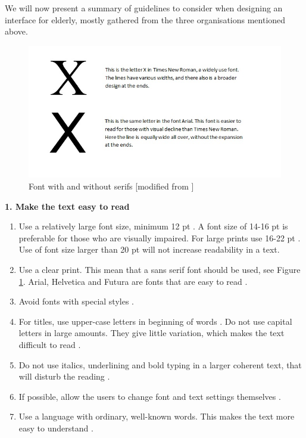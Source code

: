 We will now present a summary of guidelines to consider when designing an interface for elderly, mostly gathered from the three organisations mentioned above.

\begin{figure} [ht!]
\centering
\includegraphics[scale=0.9]{fontExample.jpg}
\caption[Fonts]{Font with and without serifs [modified from \cite{blindeforbundetTekst}]}
\label{fig:fonts}
\end{figure}

\textbf{1. Make the text easy to read}
\begin{enumerate}[{1}.a]
\item Use a relatively large font size, minimum 12 pt \cite{blindeforbundetTekst} \cite{evengrounds}. A font size of 14-16 pt is preferable for those who are visually impaired. For large prints use 16-22 pt \cite{actionforblindpeopleTekst}. Use of font size larger than 20 pt will not increase readability in a text.     
\item Use a clear print. This mean that a sans serif font should be used, see Figure \ref{fig:fonts}. Arial, Helvetica and Futura are fonts that are easy to read \cite{actionforblindpeopleTekst}.
\item Avoid fonts with special styles \cite{blindeforbundetTekst} \cite{actionforblindpeopleTekst}.
\item For titles, use upper-case letters in beginning of words \cite{actionforblindpeopleTekst}. Do not use capital letters in large amounts. They give little variation, which makes the text difficult to read \cite{blindeforbundetTekst}. 
\item Do not use italics, underlining and bold typing in a larger coherent text, that will disturb the reading \cite{blindeforbundetTekst} \cite{actionforblindpeopleTekst}.  
\item If possible, allow the users to change font and text settings themselves \cite{blindeforbundetTekst} \cite{w3cTekst}. 
\item Use a language with ordinary, well-known words. This makes the text more easy to understand \cite{w3cTekst}. \\ 
\end{enumerate} 

